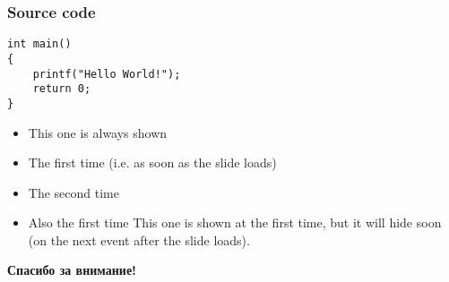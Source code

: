 \documentclass[10pt]{beamer}
\begin{document}

\begin{frame}[fragile]
\frametitle{Source code}

\begin{lstlisting}[caption=First C example]
int main()
{
    printf("Hello World!");
    return 0;
}
\end{lstlisting}

\begin{itemize}
  \item This one is always shown
  \item<1-> The first time (i.e. as soon as the slide loads)
  \item<2-> The second time
  \item<1-> Also the first time
   {This one is shown at the first time, but it will hide soon (on the next event after the slide loads).}
\end{itemize}
\end{frame}



\begin{frame}{}
\begin{center}
\Huge\textbf{Спасибо за внимание!}
\end{center}

\end{frame}
\end{document}
